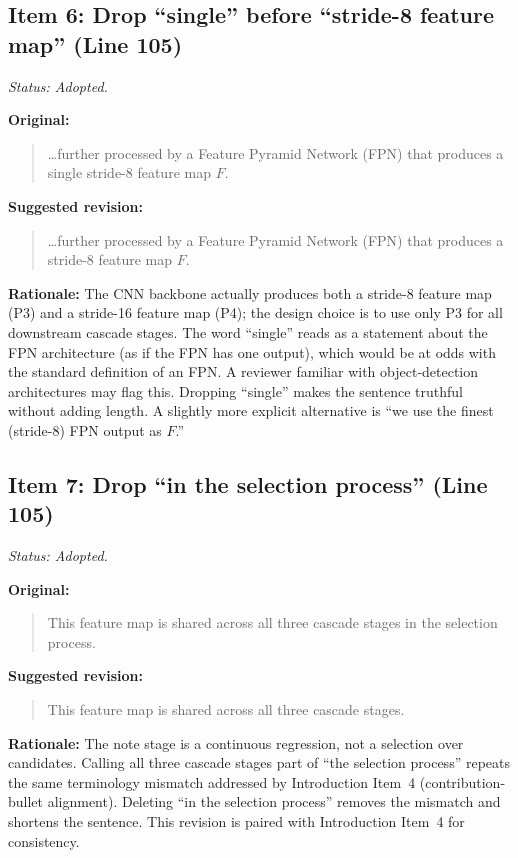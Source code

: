 \documentclass{article}
\begin{document}
\subsection*{Item 6: Drop ``single'' before ``stride-8 feature map'' (Line 105)}

\textit{Status: Adopted.}

\textbf{Original:}
\begin{quote}
\ldots further processed by a Feature Pyramid Network (FPN) that produces a single stride-8 feature map $F$.
\end{quote}

\textbf{Suggested revision:}
\begin{quote}
\ldots further processed by a Feature Pyramid Network (FPN) that produces a stride-8 feature map $F$.
\end{quote}

\textbf{Rationale:}
The CNN backbone actually produces both a stride-8 feature map (P3) and a stride-16 feature map (P4); the design choice is to use only P3 for all downstream cascade stages. The word ``single'' reads as a statement about the FPN architecture (as if the FPN has one output), which would be at odds with the standard definition of an FPN. A reviewer familiar with object-detection architectures may flag this. Dropping ``single'' makes the sentence truthful without adding length. A slightly more explicit alternative is ``we use the finest (stride-8) FPN output as $F$.''

\subsection*{Item 7: Drop ``in the selection process'' (Line 105)}

\textit{Status: Adopted.}

\textbf{Original:}
\begin{quote}
This feature map is shared across all three cascade stages in the selection process.
\end{quote}

\textbf{Suggested revision:}
\begin{quote}
This feature map is shared across all three cascade stages.
\end{quote}

\textbf{Rationale:}
The note stage is a continuous regression, not a selection over candidates. Calling all three cascade stages part of ``the selection process'' repeats the same terminology mismatch addressed by Introduction Item~4 (contribution-bullet alignment). Deleting ``in the selection process'' removes the mismatch and shortens the sentence. This revision is paired with Introduction Item~4 for consistency.
\end{document}
